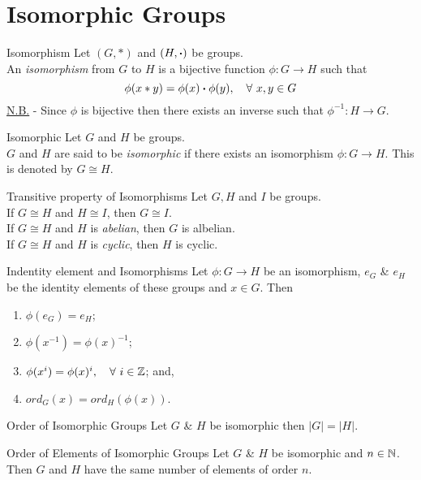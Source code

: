\documentclass[11pt,a4paper]{article}
\begin{document}
\section{Isomorphic Groups}

\subtitle{Definition 9.01 - }{Isomorphism}
Let $(G, *)$ and $(H, \boldsymbol{\cdot})$ be groups.\\
An \textit{isomorphism} from $G$ to $H$ is a bijective function $\phi : G \to H$ such that $$\phi(x * y) = \phi(x) \boldsymbol{\cdot} \phi(y),\quad \forall\ x, y \in G$$
\underline{N.B.} - Since $\phi$ is bijective then there exists an inverse such that $\phi^{-1} : H \to G$.\\

\subtitle{Definition 9.02 - }{Isomorphic}
Let $G$ and $H$ be groups.\\
$G$ and $H$ are said to be \textit{isomorphic} if there exists an isomorphism $\phi : G \to H$. This is denoted by $G \cong H$.\\

\subtitle{Proposition 9.03 - }{Transitive property of Isomorphisms}
Let $G, H$ and $I$ be groups.\\
If $G \cong H$  and $H \cong I$, then $G \cong I$.\\
If $G \cong H$ and $H$ is \textit{abelian}, then $G$ is albelian.\\
If $G \cong H$ and $H$ is \textit{cyclic}, then $H$ is cyclic.\\

\subtitle{Proposition 9.04 - }{Indentity element and Isomorphisms}
Let $\phi : G \to H$ be an isomorphism, $e_G$ \& $e_H$ be the identity elements of these groups and $x \in G$. Then
\begin{enumerate}[label=\roman*)]
  \item $\phi(e_G) = e_H$;
  \item $\phi(x^{-1}) = \phi(x)^{-1}$;
  \item $\phi(x^i) = \phi(x)^i,\quad \forall\ i \in \mathbb{Z}$; and,
  \item $ord_G(x) = ord_H(\phi(x))$.\\
\end{enumerate}

\subtitle{Proposition 9.05 - }{Order of Isomorphic Groups}
Let $G$ \& $H$ be isomorphic then $|G| = |H|$.\\

\subtitle{Proposition 9.06 - }{Order of Elements of Isomorphic Groups}
Let $G$ \& $H$ be isomorphic and $n \in \mathbb{N}$.\\
Then $G$ and $H$ have the same number of elements of order $n$.
\end{document}

